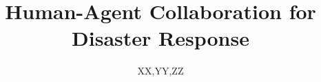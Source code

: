 \documentclass{svjour3}                     %
\begin{document}


\title{Human-Agent Collaboration for Disaster Response}




%
%
%
%

%

%
\author{XX,YY,ZZ}

%
\end{document}

